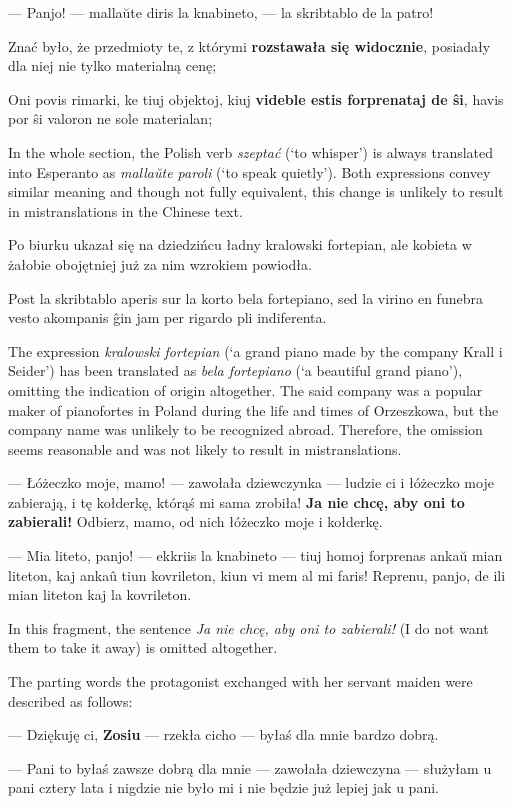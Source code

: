 --- Panjo! --- mallaŭte diris la knabineto, --- la skribtablo de la patro!

Znać było, że przedmioty te, z którymi \textbf{rozstawała się widocznie}, posiadały dla niej nie tylko materialną cenę;

Oni povis rimarki, ke tiuj objektoj, kiuj \textbf{videble estis forprenataj de ŝi}, havis por ŝi valoron ne sole materialan;

In the whole section, the Polish verb \textit{szeptać} (`to whisper') is always translated into Esperanto as \textit{mallaŭte paroli} (`to speak quietly').
Both expressions convey similar meaning and though not fully equivalent, this change is unlikely to result in mistranslations in the Chinese text.

Po biurku ukazał się na dziedzińcu ładny kralowski fortepian, ale kobieta w żałobie obojętniej już za nim wzrokiem powiodła.

Post la skribtablo aperis sur la korto bela fortepiano, sed la virino en funebra vesto akompanis ĝin jam per rigardo pli indiferenta.

The expression \textit{kralowski fortepian} (`a grand piano made by the company Krall i Seider') has been translated as \textit{bela fortepiano} (`a beautiful grand piano'), omitting the indication of origin altogether.
The said company was a popular maker of pianofortes in Poland during the life and times of Orzeszkowa, but the company name was unlikely to be recognized abroad.
Therefore, the omission seems reasonable and was not likely to result in mistranslations.

--- Łóżeczko moje, mamo! --- zawołała dziewczynka --- ludzie ci i łóżeczko moje zabierają, i tę kołderkę, którąś mi sama zrobiła! \textbf{Ja nie chcę, aby oni to zabierali!} Odbierz, mamo, od nich łóżeczko moje i kołderkę.

--- Mia liteto, panjo! --- ekkriis la knabineto --- tiuj homoj forprenas ankaŭ mian liteton, kaj ankaû tiun kovrileton, kiun vi mem al mi faris! Reprenu, panjo, de ili mian liteton kaj la kovrileton.

In this fragment, the sentence \textit{Ja nie chcę, aby oni to zabierali!} (I do not want them to take it away) is omitted altogether.

The parting words the protagonist exchanged with her servant maiden were described as follows:

--- Dziękuję ci, \textbf{Zosiu} --- rzekła cicho --- byłaś dla mnie bardzo dobrą.

--- Pani to byłaś zawsze dobrą dla mnie --- zawołała dziewczyna --- służyłam u pani cztery lata i nigdzie nie było mi i nie będzie już lepiej jak u pani.

